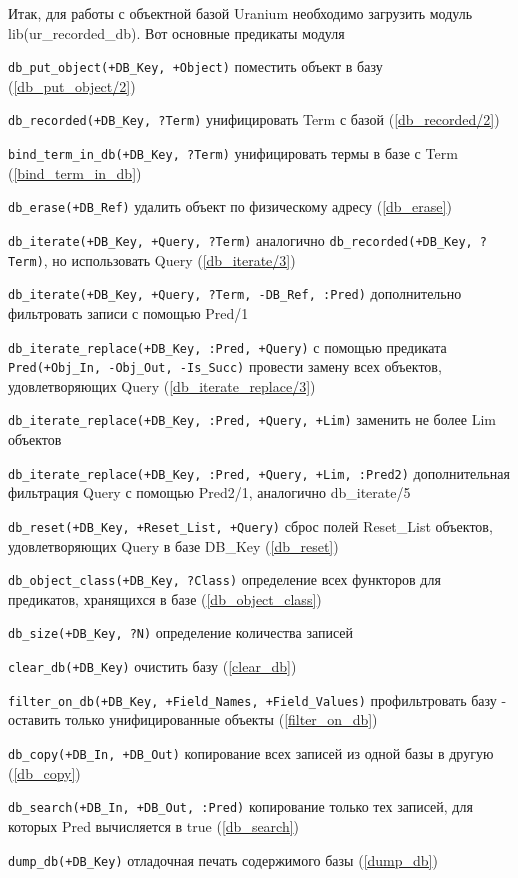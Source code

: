 \documentclass[a4paper]{book}
\def\ur{Uranium}
\begin{document}
Итак, для работы с объектной базой \ur{} необходимо загрузить
модуль lib(ur\_recorded\_db). Вот основные предикаты модуля

\begin{description}
\item \verb|db_put_object(+DB_Key, +Object)| поместить объект в
  базу (\ref{db_put_object/2})
\item \verb|db_recorded(+DB_Key, ?Term)| унифицировать Term с
  базой (\ref{db_recorded/2})
\item \verb|bind_term_in_db(+DB_Key, ?Term)| унифицировать термы в
  базе с Term (\ref{bind_term_in_db})

\item \verb|db_erase(+DB_Ref)| удалить объект по физическому
  адресу (\ref{db_erase})

\item \verb|db_iterate(+DB_Key, +Query, ?Term)| аналогично
  \verb|db_recorded(+DB_Key, ?Term)|, но использовать Query
  (\ref{db_iterate/3})
\item \verb|db_iterate(+DB_Key, +Query, ?Term, -DB_Ref, :Pred)|
  дополнительно фильтровать записи с помощью Pred/1
\item \verb|db_iterate_replace(+DB_Key, :Pred, +Query)| с помощью
  предиката \verb|Pred(+Obj_In, -Obj_Out, -Is_Succ)| провести
  замену всех объектов, удовлетворяющих Query
  (\ref{db_iterate_replace/3})
\item \verb|db_iterate_replace(+DB_Key, :Pred, +Query, +Lim)|
  заменить не более Lim объектов
\item
  \verb|db_iterate_replace(+DB_Key, :Pred, +Query, +Lim, :Pred2)|
  дополнительная фильтрация Query с помощью Pred2/1, аналогично
  db\_iterate/5
\item \verb|db_reset(+DB_Key, +Reset_List, +Query)| сброс полей
  Reset\_List объектов, удовлетворяющих Query в базе DB\_Key (\ref{db_reset})

\item \verb|db_object_class(+DB_Key, ?Class)| определение всех
  функторов для предикатов, хранящихся в базе
  (\ref{db_object_class})

\item \verb|db_size(+DB_Key, ?N)| определение количества записей
\item \verb|clear_db(+DB_Key)| очистить базу (\ref{clear_db})
\item \verb|filter_on_db(+DB_Key, +Field_Names, +Field_Values)|
  профильтровать базу - оставить только унифицированные объекты
  (\ref{filter_on_db})
\item \verb|db_copy(+DB_In, +DB_Out)| копирование всех записей из
  одной базы в другую (\ref{db_copy})
\item \verb|db_search(+DB_In, +DB_Out, :Pred)| копирование только
  тех записей, для которых Pred вычисляется в true
  (\ref{db_search})
\item \verb|dump_db(+DB_Key)| отладочная печать содержимого базы
  (\ref{dump_db})
\end{description}
\end{document}
